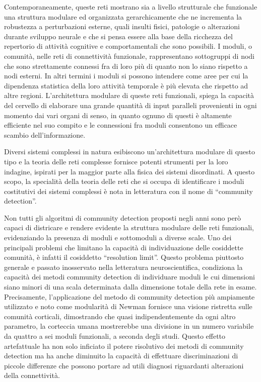 Contemporaneamente, queste reti mostrano sia a livello strutturale che funzionale una struttura modulare ed organizzata gerarchicamente che ne incrementa la robustezza a perturbazioni esterne, quali insulti fisici, patologie o alterazioni durante sviluppo neurale e che si pensa essere alla base della ricchezza del repertorio di attività cognitive e comportamentali che sono possibili.
I moduli, o comunità, nelle reti di connettività funzionale, rappresentano sottogruppi di nodi che sono strettamente connessi fra di loro più di quanto non lo siano rispetto a nodi esterni.
In altri termini i moduli si possono intendere come aree per cui la dipendenza statistica della loro attività temporale è più elevata che rispetto ad altre regioni.
L'architettura modulare di queste reti funzionali, spiega la capacità del cervello di elaborare una grande quantità di input paralleli provenienti in ogni momento dai vari organi di senso, in quanto ognuno di questi è altamente efficiente nel suo compito e le connessioni fra moduli consentono un efficace scambio dell'informazione. 

Diversi sistemi complessi in natura esibiscono un'architettura modulare di questo tipo e la teoria delle reti complesse fornisce potenti strumenti per la loro indagine, ispirati per la maggior parte alla fisica dei sistemi disordinati.
A questo scopo, la specialità della teoria delle reti che si occupa di identificare i moduli costitutivi dei sistemi complessi è nota in letteratura con il nome di ``community detection''.

Non tutti gli algoritmi di community detection proposti negli anni sono però capaci di districare e rendere evidente la struttura modulare delle reti funzionali, evidenziando la presenza di moduli e sottomoduli a diverse scale.
Uno dei principali problemi che limitano la capacità di individuazione delle cosiddette comunità, è infatti il cosiddetto ``resolution limit''.
Questo problema piuttosto generale e passato inosservato nella letteratura neuroscientifica, condiziona la capacità dei metodi community detection di individuare moduli le cui dimensioni siano minori di una scala determinata dalla dimensione totale della rete in esame.
Precisamente, l'applicazione del metodo di community detection più ampiamente utilizzato e noto come modularità di Newman fornisce una visione ristretta sulle comunità corticali, dimostrando che quasi indipendentemente da ogni altro parametro, la corteccia umana mostrerebbe una divisione in un numero variabile da quattro a sei moduli funzionali, a seconda degli studi.
Questo effetto artefattuale ha non solo inficiato il potere risolutivo dei metodi di community detection ma ha anche diminuito la capacità di effettuare discriminazioni di piccole differenze che possono portare ad utili diagnosi riguardanti alterazioni della connettività.

